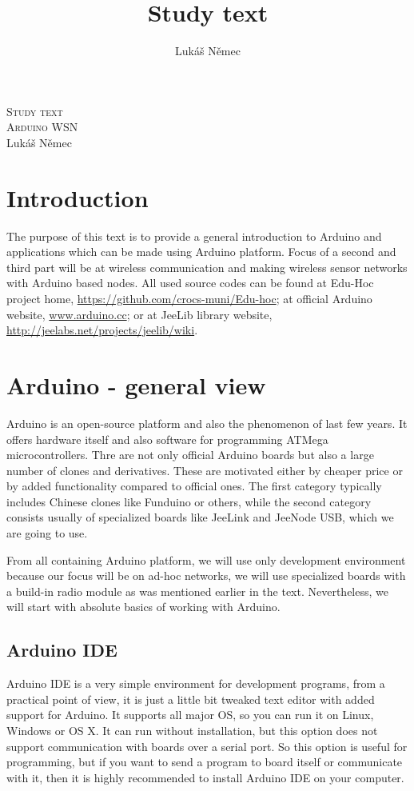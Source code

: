 \documentclass[12pt,titlepage]{article}
\title{Study text}
\author{Lukáš Němec}
\begin{document}
 \begin{titlepage} \begin{center} \textsc{\LARGE Study
text}\\[1cm] \textsc{\Large Arduino WSN}\\[0.6cm]


\Large{Lukáš Němec}\\[1cm]

\bigskip
\bigskip

\end{center}
\end{titlepage}



\tableofcontents
\newpage
\section{Introduction}

The purpose of this text is to provide a general introduction to Arduino and applications which can be made using Arduino platform. Focus of a second and third part will be at wireless communication and making wireless sensor networks with Arduino based nodes. All used source codes can be found at Edu-Hoc project home, \url{https://github.com/crocs-muni/Edu-hoc}; at official Arduino website, \url{www.arduino.cc}; or at JeeLib library website, \url{http://jeelabs.net/projects/jeelib/wiki}.

\section{Arduino - general view}
Arduino is an open-source platform and also the phenomenon of last few years. It offers hardware itself and also software for programming ATMega microcontrollers. Thre are not only official Arduino boards but also a large number of clones and derivatives. These are motivated either by cheaper price or by added functionality compared to official ones. The first category  typically includes Chinese clones like Funduino or others, while the second category consists usually of specialized boards like JeeLink and JeeNode USB, which we are going to use.

From all containing Arduino platform, we will use only development environment because our focus will be on ad-hoc networks, we will use specialized boards with a build-in radio module as was mentioned earlier in the text. Nevertheless, we will start with absolute basics of working with Arduino.

    \subsection{Arduino IDE}
    Arduino IDE is a very simple environment for development programs, from a practical point of view, it is just a little bit tweaked text editor with added support for Arduino.
    It supports all major OS, so you can run it on Linux, Windows or OS X. It can run without installation, but this option does not support communication with boards over a serial port. So this option is useful for programming, but if you want to send a program to board itself or communicate with it, then it is highly recommended to install Arduino IDE on your computer.
\end{document}
